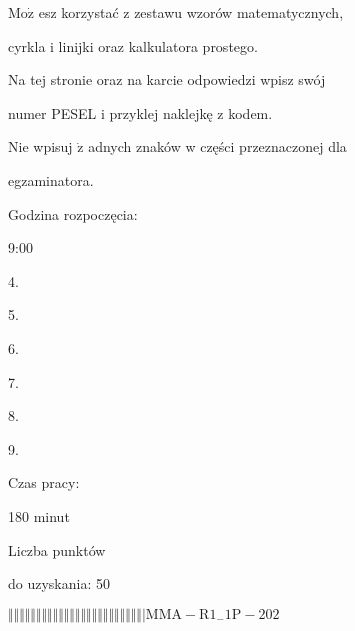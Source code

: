 \documentclass[a4paper,12pt]{article}
\begin{document}
$\mathrm{M}\mathrm{o}\dot{\mathrm{z}}$ esz korzystać z zestawu wzorów matematycznych,

cyrkla i linijki oraz kalkulatora prostego.

Na tej stronie oraz na karcie odpowiedzi wpisz swój

numer PESEL i przyklej naklejkę z kodem.

Nie wpisuj $\dot{\mathrm{z}}$ adnych znaków w części przeznaczonej dla

egzaminatora.

Godzina rozpoczęcia:

9:00

4.

5.

6.

7.

8.

9.

Czas pracy:

180 minut

Liczba punktów

do uzyskania: 50

$\Vert\Vert\Vert\Vert\Vert\Vert\Vert\Vert\Vert\Vert\Vert\Vert\Vert\Vert\Vert\Vert\Vert\Vert\Vert\Vert\Vert\Vert\Vert\Vert|  \mathrm{M}\mathrm{M}\mathrm{A}-\mathrm{R}1_{-}1\mathrm{P}-202$
\end{document}
